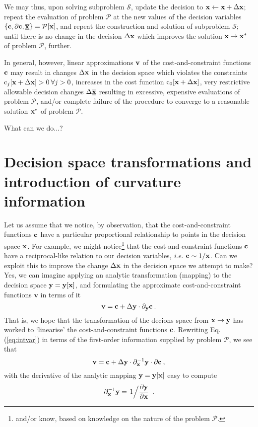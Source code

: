 \documentclass[11pt]{article}
\begin{document}
We may thus, upon solving subproblem $\mathcal{S}$, update the decision to $\mathbf{x} \gets \mathbf{x} + \Delta \mathbf{x}$; repeat the evaluation of problem $\mathcal{P}$ at the new values of the decision variables $\left\{\mathbf{c}, \partial \mathbf{c}, \underline{\overline{\mathbf{x}}}\right\}=\mathcal{P}[\mathbf{x}]$, and repeat the construction and solution of subproblem $\mathcal{S}$; until there is no change in the decision $\Delta \mathbf{x}$ which improves the solution $\mathbf{x} \to \mathbf{x}^\ast$ of problem $\mathcal{P}$, further. 

In general, however, linear approximations $\mathbf{v}$ of the cost-and-constraint functions $\mathbf{c}$ may result in changes $\Delta \mathbf{x}$ in the decision space which violates the constraints $\textrm{c}_j[\mathbf{x} + \Delta \mathbf{x}] > 0 \: \forall j > 0$, increases in the cost function $\textrm{c}_0[\mathbf{x} + \Delta \mathbf{x}]$, very restrictive allowable decision changes $\Delta \underline{\overline{\mathbf{x}}}$ resulting in excessive, expensive evaluations of problem $\mathcal{P}$, and/or complete failure of the procedure to converge to a reasonable solution $\mathbf{x}^\ast$ of problem $\mathcal{P}$.

What can we do...?

\section{Decision space transformations and introduction of curvature information}

Let us assume that we notice, by observation, that the cost-and-constraint functions $\mathbf{c}$ have a particular proportional relationship to points in the decision space $\mathbf{x}$. For example, we might notice\footnote{and/or know, based on knowledge on the nature of the problem $\mathcal{P}$.} that the cost-and-constraint functions $\mathbf{c}$ have a reciprocal-like relation to our decision variables, \emph{i.e.} $\mathbf{c} \sim 1/\mathbf{x}$. Can we exploit this to improve the change $\Delta \mathbf{x}$ in the decision space we attempt to make? Yes, we can imagine applying an analytic transformation (mapping) to the decision space $\mathbf{y} = \mathbf{y}[\mathbf{x}]$, and formulating the approximate cost-and-constraint functions $\textbf{v}$ in terms of it
\begin{equation}
\label{eq:intvar}
    \textbf{v} = \mathbf{c} + \Delta \mathbf{y} \cdot \partial_{\mathbf{y}} \mathbf{c} \:.
\end{equation}
That is, we hope that the transformation of the decions space from $\mathbf{x} \to \mathbf{y}$ has worked to `linearise' the cost-and-constraint functions $\mathbf{c}$. Rewriting Eq. (\ref{eq:intvar}) in terms of the first-order information supplied by problem $\mathcal{P}$, we see that
\begin{equation}
    \textbf{v} = \mathbf{c} + \Delta \mathbf{y} \cdot \partial_{\mathbf{x}}^{-1} \mathbf{y} \cdot \partial \mathbf{c} \:,
\end{equation}
with the derivative of the analytic mapping $\mathbf{y} = \mathbf{y}[\mathbf{x}]$ easy to compute
\begin{equation}
    \partial_{\mathbf{x}}^{-1} \mathbf{y} = \left. 1 \Big/ \frac{\partial \mathbf{y}}{\partial \mathbf{x}}\right. \: .
\end{equation}
\end{document}
